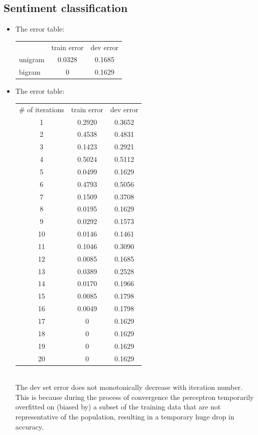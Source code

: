 \documentclass[11pt]{article}
\begin{document}
\begin{onehalfspace}
	\subsection*{Sentiment classification}
	\begin{itemize}
		\item
		The error table:\\
		\begin{tabular}{l | c | c}
		& train error & dev error\\
		unigram & 0.0328 & 0.1685\\
		bigram & 0 & 0.1629
		\end{tabular}
		\item
		The error table:\\
		\begin{tabular}{c | c | c}
		\# of iterations & train error & dev error\\
		1 & 0.2920 & 0.3652\\
		2 & 0.4538 & 0.4831\\
		3 & 0.1423 & 0.2921\\
		4 & 0.5024 & 0.5112\\
		5 & 0.0499 & 0.1629\\
		6 & 0.4793 & 0.5056\\
		7 & 0.1509 & 0.3708\\
		8 & 0.0195 & 0.1629\\
		9 & 0.0292 & 0.1573\\
		10 & 0.0146 & 0.1461\\
		11 & 0.1046 & 0.3090\\
		12 & 0.0085 & 0.1685\\
		13 & 0.0389 & 0.2528\\
		14 & 0.0170 & 0.1966\\
		15 & 0.0085 & 0.1798\\
		16 & 0.0049 & 0.1798\\
		17 & 0 & 0.1629\\
		18 & 0 & 0.1629\\
		19 & 0 & 0.1629\\
		20 & 0 & 0.1629\\
		\end{tabular}\\
		The dev set error does not monotonically decrease with iteration number.\\
		This is because during the process of convergence the perceptron temporarily overfitted on (biased by) a subset of the training data that are not representative of the population, resulting in a temporary huge drop in accuracy.
	\end{itemize}

\end{onehalfspace}
\end{document}
